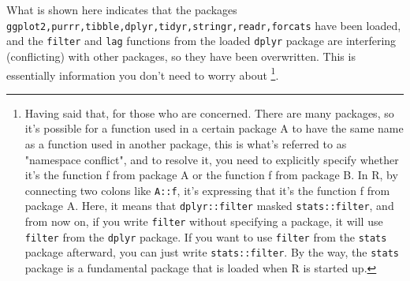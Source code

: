 \documentclass{ltjsbook}
\begin{document}

What is shown here indicates that the packages \verb|ggplot2,purrr,tibble,dplyr,tidyr,stringr,readr,forcats| have been loaded, and the \verb|filter| and \verb|lag| functions from the loaded \verb|dplyr| package are interfering (conflicting) with other packages, so they have been overwritten. This is essentially information you don't need to worry about \footnote{Having said that, for those who are concerned. There are many packages, so it's possible for a function used in a certain package A to have the same name as a function used in another package, this is what's referred to as "namespace conflict", and to resolve it, you need to explicitly specify whether it's the function f from package A or the function f from package B. In R, by connecting two colons like \verb|A::f|, it's expressing that it's the function f from package A. Here, it means that \verb|dplyr::filter| masked \verb|stats::filter|, and from now on, if you write \verb|filter| without specifying a package, it will use \verb|filter| from the \verb|dplyr| package. If you want to use \verb|filter| from the \verb|stats| package afterward, you can just write \verb|stats::filter|. By the way, the \verb|stats| package is a fundamental package that is loaded when R is started up. }.
\end{document}
